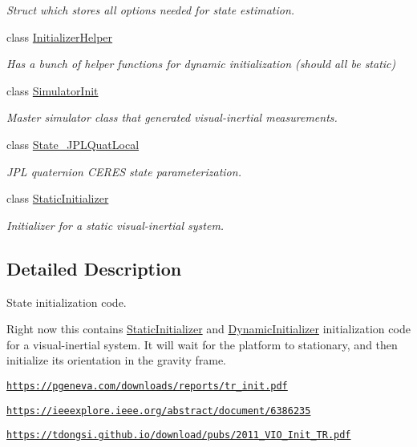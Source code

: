 \begin{DoxyCompactItemize}
\begin{DoxyCompactList}\small\item\em Struct which stores all options needed for state estimation. \end{DoxyCompactList}\item 
class \hyperlink{classov__init_1_1InitializerHelper}{Initializer\+Helper}
\begin{DoxyCompactList}\small\item\em Has a bunch of helper functions for dynamic initialization (should all be static) \end{DoxyCompactList}\item 
class \hyperlink{classov__init_1_1SimulatorInit}{Simulator\+Init}
\begin{DoxyCompactList}\small\item\em Master simulator class that generated visual-\/inertial measurements. \end{DoxyCompactList}\item 
class \hyperlink{classov__init_1_1State__JPLQuatLocal}{State\+\_\+\+J\+P\+L\+Quat\+Local}
\begin{DoxyCompactList}\small\item\em J\+PL quaternion C\+E\+R\+ES state parameterization. \end{DoxyCompactList}\item 
class \hyperlink{classov__init_1_1StaticInitializer}{Static\+Initializer}
\begin{DoxyCompactList}\small\item\em Initializer for a static visual-\/inertial system. \end{DoxyCompactList}\end{DoxyCompactItemize}


\subsection{Detailed Description}
State initialization code. 

Right now this contains \hyperlink{classov__init_1_1StaticInitializer}{Static\+Initializer} and \hyperlink{classov__init_1_1DynamicInitializer}{Dynamic\+Initializer} initialization code for a visual-\/inertial system. It will wait for the platform to stationary, and then initialize its orientation in the gravity frame.


\begin{DoxyItemize}
\item \href{https://pgeneva.com/downloads/reports/tr_init.pdf}{\tt https\+://pgeneva.\+com/downloads/reports/tr\+\_\+init.\+pdf}
\item \href{https://ieeexplore.ieee.org/abstract/document/6386235}{\tt https\+://ieeexplore.\+ieee.\+org/abstract/document/6386235}
\item \href{https://tdongsi.github.io/download/pubs/2011_VIO_Init_TR.pdf}{\tt https\+://tdongsi.\+github.\+io/download/pubs/2011\+\_\+\+V\+I\+O\+\_\+\+Init\+\_\+\+T\+R.\+pdf}
\end{DoxyItemize}

